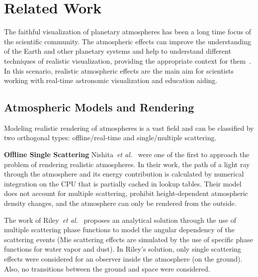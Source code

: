 \documentclass[journal]{vgtc}                %
\newcommand{\anderscomment}[1]{\textbf{[AY~} \textcolor{cyan}{#1} \textbf{~]}}
\newcommand{\etal}{\emph{et al.}}
\begin{document}

\section{Related Work}


The faithful visualization of planetary atmospheres has been a long time focus of the scientific community. The atmospheric effects can improve the understanding of the Earth and other planetary systems and help to understand different techniques of realistic visualization, providing the appropriate context for them~\cite{vis17-bladin-globe-browsing}. In this scenario, realistic atmospheric effects are the main aim for scientists working with real-time astronomic visualization and education aiding. 


\subsection{Atmospheric Models and Rendering}

Modeling realistic rendering of atmospheres is a vast field and can be classified by two orthogonal types: offline/real-time and single/multiple scattering.



\noindent \textbf{Offline Single Scattering} \quad Nishita~\etal~\cite{Nishita:1993} were one of the first to approach the problem of rendering realistic atmospheres. In their work, the path of a light ray through the atmosphere and its energy contribution is calculated by numerical integration on the CPU that is partially cached in lookup tables. Their model does not account for multiple scattering, prohibit height-dependent atmospheric density changes, and the atmosphere can only be rendered from the outside.

The work of Riley~\etal~\cite{Riley:2004} proposes an analytical solution through the use of multiple scattering phase functions to model the angular dependency of the scattering events (Mie scattering effects are simulated by the use of specific phase functions for water vapor and dust). In Riley's solution, only single scattering effects were considered for an observer inside the atmosphere (on the ground). Also, no transitions between the ground and space were considered.
\end{document}
